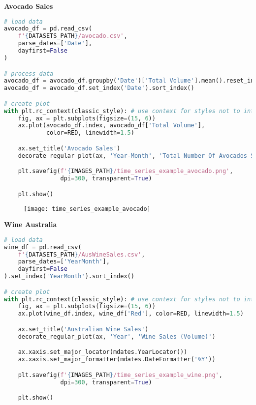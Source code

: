 {\noindent\hspace{-12.5pt}\normalsize\bfseries Avocado Sales}\vspace{-10pt}
\begin{center}
  \begin{lstlisting}[language=Python, 
  caption={Еженедельный объём продаж авокадо}, 
  label={lst:time_series_example_avocado}]
# load data
avocado_df = pd.read_csv(
    f'{DATASETS_PATH}/avocado.csv',
    parse_dates=['Date'],
    dayfirst=False
)

# process data
avocado_df = avocado_df.groupby('Date')['Total Volume'].mean().reset_index()
avocado_df = avocado_df.set_index('Date').sort_index()

# create plot
with plt.rc_context(classic_style): # use context for styles not to interfere
    fig, ax = plt.subplots(figsize=(15, 6))
    ax.plot(avocado_df.index, avocado_df['Total Volume'], 
            color=RED, linewidth=1.5)

    ax.set_title('Avocado Sales')
    decorate_regular_plot(ax, 'Year-Month', 'Total Number Of Avocados Sold')

    plt.savefig(f'{IMAGES_PATH}/time_series_example_avocado.png', 
                dpi=300, transparent=True)

    plt.show()
  \end{lstlisting}
\end{center}

\begin{figure}[h!]
  \centering
  \texttt{[image: time\_series\_example\_avocado]}
\end{figure}


{\noindent\hspace{-12.5pt}\normalsize\bfseries Wine Australia}\vspace{-10pt}
\begin{center}
  \begin{lstlisting}[language=Python, 
  caption={Месячный объём продаж красного вина в Австралии.}, 
  label={lst:time_series_example_wine}]
# load data
wine_df = pd.read_csv(
    f'{DATASETS_PATH}/AusWineSales.csv',
    parse_dates=['YearMonth'],
    dayfirst=False
).set_index('YearMonth').sort_index()

# create plot
with plt.rc_context(classic_style): # use context for styles not to interfere
    fig, ax = plt.subplots(figsize=(15, 6))
    ax.plot(wine_df.index, wine_df['Red'], color=RED, linewidth=1.5)

    ax.set_title('Australian Wine Sales')
    decorate_regular_plot(ax, 'Year', 'Wine Sales (Volume)')

    ax.xaxis.set_major_locator(mdates.YearLocator())
    ax.xaxis.set_major_formatter(mdates.DateFormatter('%Y'))

    plt.savefig(f'{IMAGES_PATH}/time_series_example_wine.png', 
                dpi=300, transparent=True)

    plt.show()
  \end{lstlisting}
\end{center}

